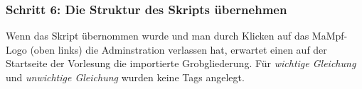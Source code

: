 \documentclass[parskip=off,index=totocnumbered]{scrartcl}
\newenvironment{rückkeinstück2}
	{\begin{adjustwidth}{0cm}{0cm}\footnotesize \singlespace} 
	{\end{adjustwidth} \onehalfspacing}
\begin{document}
\subsubsection*{Schritt 6: Die Struktur des Skripts übernehmen}
    \noindent \begin{minipage}{\textwidth}
    \begin{rückkeinstück2}
        Wenn das Skript übernommen wurde und man durch Klicken auf das MaMpf-Logo (oben links) die Adminstration verlassen hat, erwartet einen auf der Startseite der Vorlesung die importierte Grobgliederung. Für \textit{wichtige Gleichung} und \textit{unwichtige Gleichung} wurden keine Tags angelegt. 
        \vspace{0.6cm}
    \end{rückkeinstück2}                
\end{minipage}
              
\end{document}
